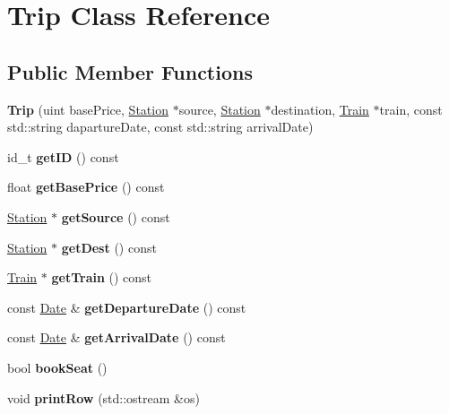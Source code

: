 \hypertarget{classTrip}{}\section{Trip Class Reference}
\label{classTrip}
\subsection*{Public Member Functions}
\begin{DoxyCompactItemize}
\item 
\mbox{\label{classTrip_ad7244e90c71e27914dab013835883502}} 
{\bfseries Trip} (uint base\+Price, \mbox{\hyperlink{classStation}{Station}} $\ast$source, \mbox{\hyperlink{classStation}{Station}} $\ast$destination, \mbox{\hyperlink{classTrain}{Train}} $\ast$train, const std\+::string daparture\+Date, const std\+::string arrival\+Date)
\item 
\mbox{\label{classTrip_a7770a61e1211789c80b003eeedcaa09c}} 
id\+\_\+t {\bfseries get\+ID} () const
\item 
\mbox{\label{classTrip_aa356ea90590c617311c911c98aac4093}} 
float {\bfseries get\+Base\+Price} () const
\item 
\mbox{\label{classTrip_a65b45d4816c85d47ef743e7c1cfe807f}} 
\mbox{\hyperlink{classStation}{Station}} $\ast$ {\bfseries get\+Source} () const
\item 
\mbox{\label{classTrip_a459ae85fc25404ba616fabfb4b4165f4}} 
\mbox{\hyperlink{classStation}{Station}} $\ast$ {\bfseries get\+Dest} () const
\item 
\mbox{\label{classTrip_a7595a39e9aa91e321d37b1696da50024}} 
\mbox{\hyperlink{classTrain}{Train}} $\ast$ {\bfseries get\+Train} () const
\item 
\mbox{\label{classTrip_ac506905deb66415b2fcee1c89579e628}} 
const \mbox{\hyperlink{classDate}{Date}} \& {\bfseries get\+Departure\+Date} () const
\item 
\mbox{\label{classTrip_a6dddee29651df86b5a2c45bd2e1d2fc6}} 
const \mbox{\hyperlink{classDate}{Date}} \& {\bfseries get\+Arrival\+Date} () const
\item 
\mbox{\label{classTrip_a00e2b65d40562051bfe4124f581a49e1}} 
bool {\bfseries book\+Seat} ()
\item 
\mbox{\label{classTrip_a233bab5c803f51ee5e79c611a15699c0}} 
void {\bfseries print\+Row} (std\+::ostream \&os)
\end{DoxyCompactItemize}
